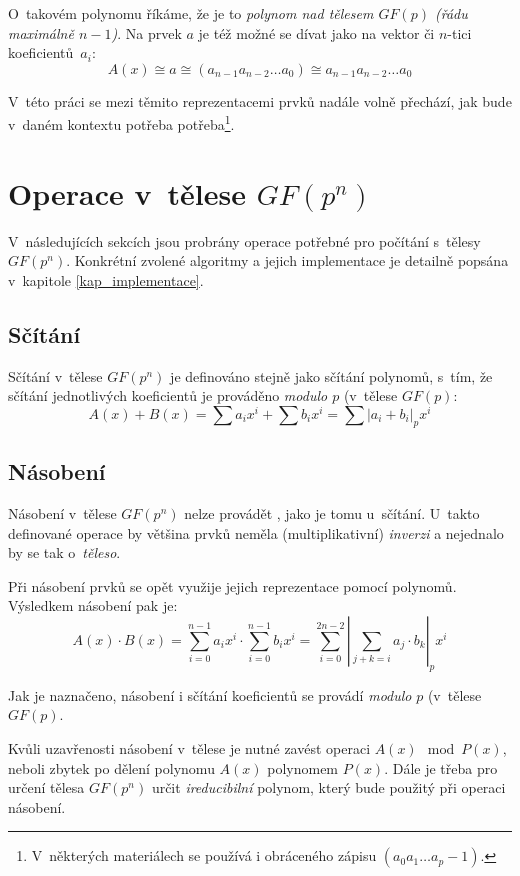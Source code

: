 \documentclass[thesis=M,czech,hidelinks]{FITthesis}[2012/06/26]
\newcommand{\0}{{\textcolor[gray]{0.100}{0}}}
\begin{document}
O~takovém polynomu říkáme, že je to \emph{polynom nad tělesem $GF(p)$ (řádu
maximálně $n-1$)}. Na prvek $a$ je též možné se dívat jako na vektor či $n$-tici
koeficientů~$a_i$:
$$ A(x) \cong a \cong (a_{n-1} a_{n-2} \ldots a_0) \cong a_{n-1} a_{n-2} \ldots a_0 $$

V~této práci se mezi těmito reprezentacemi prvků nadále volně přechází, jak
bude v~daném kontextu potřeba potřeba\footnote{
V~některých materiálech se používá i obráceného zápisu $(a_0 a_1 \ldots a_p-1)$.
}.

\section{Operace v~tělese $GF(p^n)$}
V~následujících sekcích jsou probrány operace potřebné pro počítání
s~tělesy $GF(p^n)$. Konkrétní zvolené algoritmy a jejich implementace
je detailně popsána v~kapitole \ref{kap_implementace}.

\subsection{Sčítání}
Sčítání v~tělese $GF(p^n)$ je definováno stejně jako sčítání polynomů, s~tím, že
sčítání jednotlivých koeficientů je prováděno \emph{modulo $p$} (v~tělese $GF(p)$:
$$ A(x) + B(x) = \sum a_i x^i + \sum b_i x^i = \sum \left|a_i + b_i\right|_p x^i $$


\subsection{Násobení}
Násobení v~tělese $GF(p^n)$ nelze provádět , jako je tomu
u~sčítání. U~takto definované operace by většina prvků neměla (multiplikativní)
\emph{inverzi} a nejednalo by se tak o~\emph{těleso}.

Při násobení prvků se opět využije jejich reprezentace pomocí polynomů.
Výsledkem násobení pak je:
$$ A(x) \cdot B(x) = \sum_{i=0}^{n-1} a_i x^i \cdot \sum_{i=0}^{n-1} b_i x^i =
\sum_{i=0}^{2n-2} \left|\sum_{j+k=i} a_j \cdot b_k\right|_p x^i$$

Jak je naznačeno, násobení i sčítání koeficientů se provádí \emph{modulo} $p$
(v~tělese $GF(p)$.

Kvůli uzavřenosti násobení v~tělese je nutné zavést operaci $A(x) \mod P(x)$,
neboli zbytek po dělení polynomu $A(x)$ polynomem $P(x)$. Dále je třeba pro
určení tělesa $GF(p^n)$ určit \emph{ireducibilní} polynom, který bude použitý
při operaci násobení.
\end{document}
